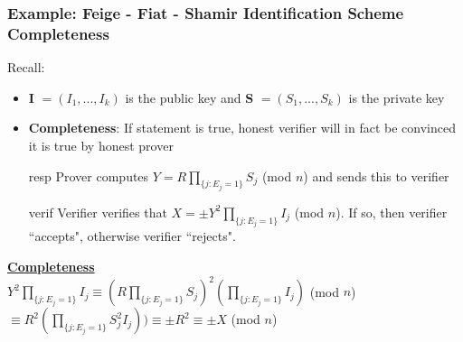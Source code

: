 \documentclass{beamer}
\begin{document}
\begin{frame}
\begin{small}
\frametitle{Example: Feige - Fiat - Shamir Identification Scheme \\Completeness}
Recall:
\begin{itemize}
\item \textbf{I} $= (I_1, ..., I_k)$ is the public key and \textbf{S} $= (S_1, ..., S_k)$ is the private key
\item \textbf{Completeness}: If statement is true, honest verifier will in fact be convinced it is true by honest prover
\item[resp] Prover computes $Y = R\prod_{\{j:E_j = 1\}} S_j$ (mod $n$) and sends this to verifier
\item[verif] Verifier verifies that $X = \pm Y^2\prod_{\{j:E_j = 1\}}I_j$ (mod $n$). If so, then verifier ``accepts", otherwise verifier ``rejects".
\end{itemize}
\underline{\textbf{Completeness}} 
\vspace{2mm}
\\$Y^2\prod_{\{j:E_j = 1\}}I_j \equiv  (R\prod_{\{j:E_j = 1\}} S_j)^2(\prod_{\{j:E_j = 1\}}I_j)$ (mod $n$)
\vspace{2mm}
\\$\equiv R^2 (\prod_{\{j:E_j = 1\}}S_j^2I_j)) \equiv \pm R^2 \equiv \pm X$ (mod $n$)
\end{small}
\end{frame}

\end{document}
